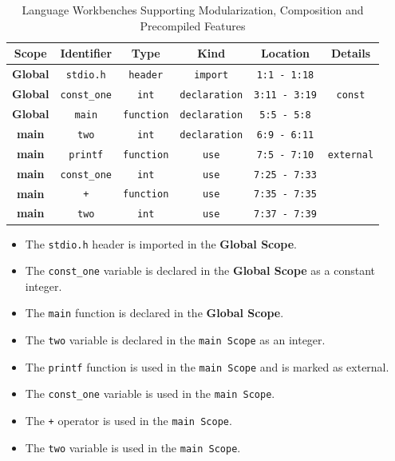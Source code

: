 \begin{table}[t]
    \centering
    \begin{tabular}{ c c c c c c }
        \toprule  \textbf{Scope} & \textbf{Identifier} & \textbf{Type} & \textbf{Kind} & \textbf{Location} & \textbf{Details} \\
        \midrule
        \textbf{Global} & \texttt{stdio.h} & \texttt{header} & \texttt{import} & \texttt{1:1 - 1:18} &  \\
        \textbf{Global} & \texttt{const\_one} & \texttt{int} & \texttt{declaration} & \texttt{3:11 - 3:19} & \texttt{const} \\
        \textbf{Global} & \texttt{main} & \texttt{function} & \texttt{declaration} & \texttt{5:5 - 5:8} &  \\
        \textbf{main} & \texttt{two} & \texttt{int} & \texttt{declaration} & \texttt{6:9 - 6:11} & \\
        \textbf{main} & \texttt{printf} & \texttt{function} & \texttt{use} & \texttt{7:5 - 7:10} & \texttt{external} \\
        \textbf{main} & \texttt{const\_one} & \texttt{int} & \texttt{use} & \texttt{7:25 - 7:33} &  \\
        \textbf{main} & \texttt{+} & \texttt{function} & \texttt{use} & \texttt{7:35 - 7:35} &  \\
        \textbf{main} & \texttt{two} & \texttt{int} & \texttt{use} & \texttt{7:37 - 7:39} &  \\
        \bottomrule
    \end{tabular}
    \caption{Language Workbenches Supporting Modularization, Composition and Precompiled Features}
    \label{tab:concept:Example}
\end{table}

\begin{itemize}
    \item The \texttt{stdio.h} header is imported in the \textbf{Global Scope}.
    \item The \texttt{const\_one} variable is declared in the \textbf{Global Scope} as a constant integer.
    \item The \texttt{main} function is declared in the \textbf{Global Scope}.
    \item The \texttt{two} variable is declared in the \texttt{main Scope} as an integer.
    \item The \texttt{printf} function is used in the \texttt{main Scope} and is marked as external.
    \item The \texttt{const\_one} variable is used in the \texttt{main Scope}.
    \item The \texttt{+} operator is used in the \texttt{main Scope}.
    \item The \texttt{two} variable is used in the \texttt{main Scope}.
\end{itemize}

